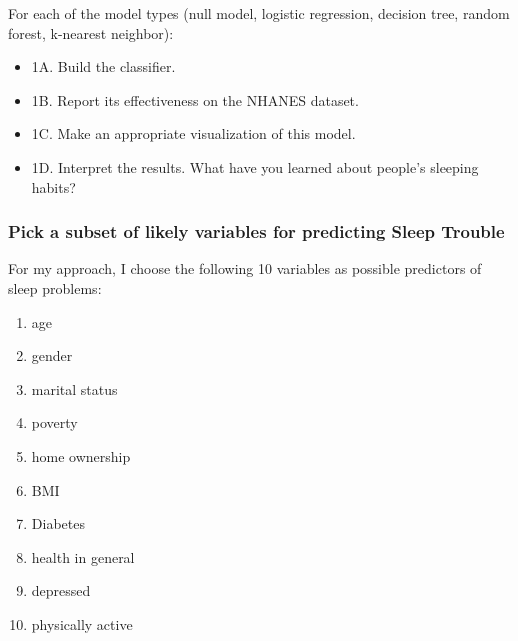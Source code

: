 \documentclass[]{article}
\newenvironment{Shaded}{\begin{snugshade}}{\end{snugshade}}
\newcommand{\KeywordTok}[1]{\textcolor[rgb]{0.13,0.29,0.53}{\textbf{{#1}}}}
\newcommand{\StringTok}[1]{\textcolor[rgb]{0.31,0.60,0.02}{{#1}}}
\newcommand{\CommentTok}[1]{\textcolor[rgb]{0.56,0.35,0.01}{\textit{{#1}}}}
\newcommand{\NormalTok}[1]{{#1}}
\providecommand{\tightlist}{%
  \setlength{\itemsep}{0pt}\setlength{\parskip}{0pt}}
\begin{document}
For each of the model types (null model, logistic regression, decision
tree, random forest, k-nearest neighbor):

\begin{itemize}
\tightlist
\item
  1A. Build the classifier.
\item
  1B. Report its effectiveness on the NHANES dataset.
\item
  1C. Make an appropriate visualization of this model.
\item
  1D. Interpret the results. What have you learned about people's
  sleeping habits?
\end{itemize}

\subsubsection{Pick a subset of likely variables for predicting Sleep
Trouble}\label{pick-a-subset-of-likely-variables-for-predicting-sleep-trouble}

For my approach, I choose the following 10 variables as possible
predictors of sleep problems:

\begin{enumerate}
\def\labelenumi{\arabic{enumi}.}
\tightlist
\item
  age
\item
  gender
\item
  marital status
\item
  poverty
\item
  home ownership
\item
  BMI
\item
  Diabetes
\item
  health in general
\item
  depressed
\item
  physically active
\end{enumerate}

\begin{Shaded}
\end{Shaded}
\end{document}
